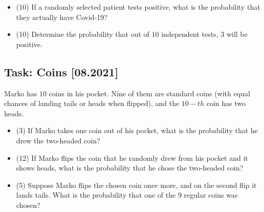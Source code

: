 \documentclass[a4paper, 12pt]{article}
\begin{document}
\begin{itemize}
    \item [a)] (10) If a randomly selected patient tests positive, what is the probability that they actually have Covid-19?
    \item [b)] (10) Determine the probability that out of $10$  independent tests, $3$ will be positive.
\end{itemize}



\subsection*{Task: Coins [08.2021]}

Marko has $10$ coins in his pocket. Nine of them are standard coins (with equal chances of landing tails or heads when flipped), and the $10-th$ coin has two heads.

\begin{itemize}
    \item [a)] (3) If Marko takes one coin out of his pocket, what is the probability that he drew the two-headed coin?

\item [b)] (12) If Marko flips the coin that he randomly drew from his pocket and it shows heads, what is the probability that he chose the two-headed coin?

\item [c)] (5) Suppose Marko flips the chosen coin once more, and on the second flip it lands tails. What is the probability that one of the $9$ regular coins was chosen?
\end{itemize}
\end{document}
